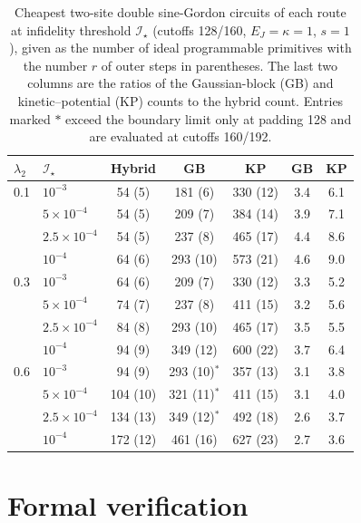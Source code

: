 \documentclass[pra,twocolumn,superscriptaddress,nofootinbib,floatfix]{revtex4-2}
\theoremstyle{remark}
\newcommand{\revcolor}{\color{blue}}
\DeclareRobustCommand{\rev}[1]{{\revcolor #1}}
\begin{document}
\begin{table}[t]
\revcolor
\caption{Cheapest two-site double sine-Gordon circuits of each route at infidelity threshold \(\mathcal I_\star\) (cutoffs 128/160, \(E_J=\kappa=1\), \(s=1\)), given as the number of ideal programmable primitives with the number \(r\) of outer steps in parentheses. The last two columns are the ratios of the Gaussian-block (GB) and kinetic--potential (KP) counts to the hybrid count. Entries marked \(\ast\) exceed the boundary limit only at padding 128 and are evaluated at cutoffs 160/192.}
\label{tab:dsg-thresholds}
\begin{ruledtabular}
\begin{tabular}{llccccc}
\(\lambda_2\) & \(\mathcal I_\star\) & Hybrid & GB & KP & GB & KP \\
\hline
0.1 & \(10^{-3}\) & 54 (5) & 181 (6) & 330 (12) & 3.4 & 6.1 \\
  & \(5\times10^{-4}\) & 54 (5) & 209 (7) & 384 (14) & 3.9 & 7.1 \\
  & \(2.5\times10^{-4}\) & 54 (5) & 237 (8) & 465 (17) & 4.4 & 8.6 \\
  & \(10^{-4}\) & 64 (6) & 293 (10) & 573 (21) & 4.6 & 9.0 \\
0.3 & \(10^{-3}\) & 64 (6) & 209 (7) & 330 (12) & 3.3 & 5.2 \\
  & \(5\times10^{-4}\) & 74 (7) & 237 (8) & 411 (15) & 3.2 & 5.6 \\
  & \(2.5\times10^{-4}\) & 84 (8) & 293 (10) & 465 (17) & 3.5 & 5.5 \\
  & \(10^{-4}\) & 94 (9) & 349 (12) & 600 (22) & 3.7 & 6.4 \\
0.6 & \(10^{-3}\) & 94 (9) & 293 (10)\(^\ast\) & 357 (13) & 3.1 & 3.8 \\
  & \(5\times10^{-4}\) & 104 (10) & 321 (11)\(^\ast\) & 411 (15) & 3.1 & 4.0 \\
  & \(2.5\times10^{-4}\) & 134 (13) & 349 (12)\(^\ast\) & 492 (18) & 2.6 & 3.7 \\
  & \(10^{-4}\) & 172 (12) & 461 (16) & 627 (23) & 2.7 & 3.6 \\
\end{tabular}
\end{ruledtabular}
\end{table}

\section{\rev{Formal verification}}
\label{app:lean}
\end{document}
